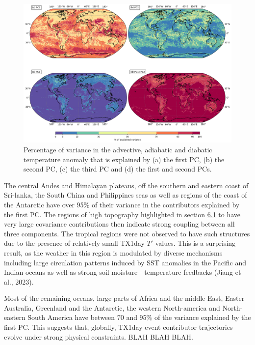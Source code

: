 \documentclass[11pt,a4paper,twoside,openright]{report}
\theoremstyle{definition}
\begin{document}
\begin{figure}[h]
\includegraphics[width=1\linewidth]{images/pca_explainedvar} \caption{Percentage of variance in the advective, adiabatic and diabatic temperature anomaly that is explained by (a) the first PC, (b) the second PC, (c) the third PC and (d) the first and second PCs.}\label{fig:pcaexplainedvar}
\end{figure}

The central Andes and Himalayan plateaus, off the southern and eastern coast of Sri-lanka, the South China and Philippines seas as well as regions of the coast of the Antarctic have over 95\% of their variance in the contributors explained by the first PC. The regions of high topography highlighted in section \hyperref[relating-tx1day-t-variability-to-component-variability]{6.1} to have very large covariance contributions then indicate strong coupling between all three components. The tropical regions were not observed to have such structures due to the presence of relatively small TX1day \(T'\) values. This is a surprising result, as the weather in this region is modulated by diverse mechanisms including large circulation patterns induced by SST anomalies in the Pacific and Indian oceans as well as strong soil moisture - temperature feedbacks (Jiang et al., 2023).

Most of the remaining oceans, large parts of Africa and the middle East, Easter Australia, Greenland and the Antarctic, the western North-america and North-eastern South America have between 70 and 95\% of the variance explained by the first PC. This suggests that, globally, TX1day event contributor trajectories evolve under strong physical constraints. BLAH BLAH BLAH.
\end{document}
